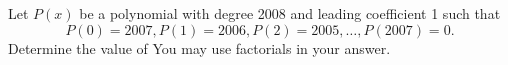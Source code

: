 Let $ P(x)$ be a polynomial with degree 2008 and leading coefficient 1 such that
\[ P(0) = 2007, P(1) = 2006, P(2) = 2005, \dots, P(2007) = 0.
\]Determine the value of   You may use factorials in your answer.